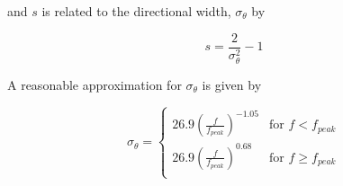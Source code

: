 and $s$ is related to the directional width, $\sigma_{\theta}$ by

\begin{equation} \label{eq:directionalDistributionFunc.sigTh}
    s = \frac{2}{\sigma_{\theta}^{2}} - 1
\end{equation}

A reasonable approximation for $\sigma_{\theta}$ is given by

\begin{equation*}
  \sigma_{\theta} =
    \begin{cases}
      26.9 \left ( \frac{f}{f_{peak}} \right ) ^{-1.05} & \text{for $f < f_{peak}$}\\
      26.9 \left ( \frac{f}{f_{peak}} \right ) ^{0.68} & \text{for $f \geq f_{peak}$}\\
    \end{cases}       
\end{equation*}











